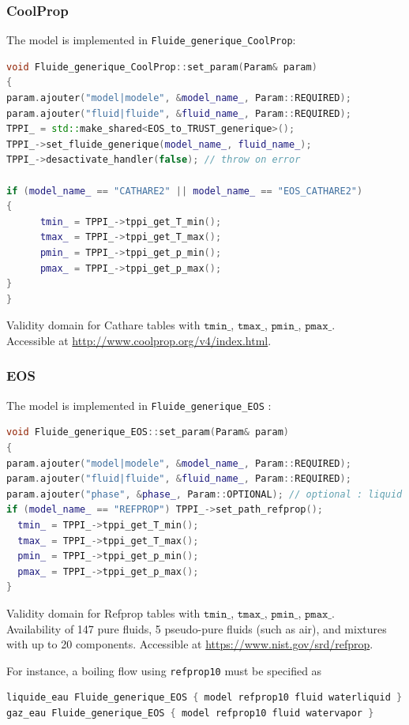 \subsubsection{CoolProp}
The model is implemented in \texttt{Fluide\_generique\_CoolProp}:
\begin{lstlisting}[language=c++]
void Fluide_generique_CoolProp::set_param(Param& param)
{
param.ajouter("model|modele", &model_name_, Param::REQUIRED);
param.ajouter("fluid|fluide", &fluid_name_, Param::REQUIRED);
TPPI_ = std::make_shared<EOS_to_TRUST_generique>();
TPPI_->set_fluide_generique(model_name_, fluid_name_);
TPPI_->desactivate_handler(false); // throw on error

if (model_name_ == "CATHARE2" || model_name_ == "EOS_CATHARE2")
{
      tmin_ = TPPI_->tppi_get_T_min();
      tmax_ = TPPI_->tppi_get_T_max();
      pmin_ = TPPI_->tppi_get_p_min();
      pmax_ = TPPI_->tppi_get_p_max();
}
}
\end{lstlisting}
Validity domain for Cathare tables with $\texttt{tmin\_}$, $\texttt{tmax\_}$, $\texttt{pmin\_}$, $\texttt{pmax\_}$.\\
Accessible at \href{http://www.coolprop.org/v4/index.html}{http://www.coolprop.org/v4/index.html}.

\subsubsection{EOS}
The model is implemented in \texttt{Fluide\_generique\_EOS} :
\begin{lstlisting}[language=c++]
void Fluide_generique_EOS::set_param(Param& param)
{
param.ajouter("model|modele", &model_name_, Param::REQUIRED);
param.ajouter("fluid|fluide", &fluid_name_, Param::REQUIRED);
param.ajouter("phase", &phase_, Param::OPTIONAL); // optional : liquid or vapor. PI : specify the phase it is really useful (better perf for coolprop) !
if (model_name_ == "REFPROP") TPPI_->set_path_refprop();
  tmin_ = TPPI_->tppi_get_T_min();
  tmax_ = TPPI_->tppi_get_T_max();
  pmin_ = TPPI_->tppi_get_p_min();
  pmax_ = TPPI_->tppi_get_p_max();
}
\end{lstlisting}
Validity domain for Refprop tables with $\texttt{tmin\_}$, $\texttt{tmax\_}$, $\texttt{pmin\_}$, $\texttt{pmax\_}$.\\ Availability of 147 pure fluids, 5 pseudo-pure fluids (such as air), and mixtures with up to 20 components. Accessible at \href{https://www.nist.gov/srd/refprop}{https://www.nist.gov/srd/refprop}.

For instance, a boiling flow using \texttt{refprop10} must be specified as
\begin{lstlisting}[language=c++]
liquide_eau Fluide_generique_EOS { model refprop10 fluid waterliquid }
gaz_eau Fluide_generique_EOS { model refprop10 fluid watervapor }
\end{lstlisting}

